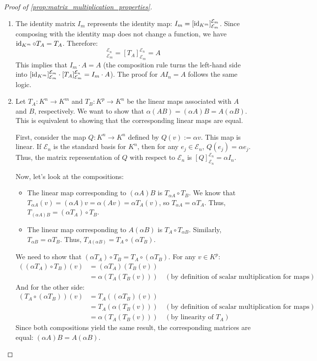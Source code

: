 \begin{proof}[Proof of \cref{prop:matrix_multiplication_properties}]
\begin{enumerate}[label=\textbf{(\alph*)}]
    \item The identity matrix $I_m$ represents the identity map: $I_m = [\operatorname{id}_{K^m}]_{\mathcal{E}_m}^{\mathcal{E}_m}$. Since composing with the identity map does not change a function, we have $\operatorname{id}_{K^m} \circ T_A = T_A$. Therefore:
    \begin{equation*}
        [\id_{K^m} \circ T_A]_{\mathcal{E}_m}^{\mathcal{E}_n} = [T_A]_{\mathcal{E}_m}^{\mathcal{E}_n} = A
    \end{equation*}
    This implies that $I_m \cdot A = A$ (the composition rule turns the left-hand side into $[\operatorname{id}_{K^m}]_{\mathcal{E}_m}^{\mathcal{E}_m} \cdot [T_A]_{\mathcal{E}_m}^{\mathcal{E}_n} = I_m \cdot A$). The proof for $A I_n = A$ follows the same logic.
    
    \item Let $T_A: K^n \to K^m$ and $T_B: K^p \to K^n$ be the linear maps associated with $A$ and $B$, respectively. We want to show that $\alpha(AB) = (\alpha A)B = A(\alpha B)$. This is equivalent to showing that the corresponding linear maps are equal.
    
    First, consider the map $Q: K^n \to K^n$ defined by $Q(v) := \alpha v$. This map is linear. If $\mathcal{E}_n$ is the standard basis for $K^n$, then for any $e_j \in \mathcal{E}_n$, $Q(e_j) = \alpha e_j$. Thus, the matrix representation of $Q$ with respect to $\mathcal{E}_n$ is $[Q]_{\mathcal{E}_n}^{\mathcal{E}_n} = \alpha I_n$.
    
    Now, let's look at the compositions:
    \begin{itemize}
        \item The linear map corresponding to $(\alpha A)B$ is $T_{\alpha A} \circ T_B$. We know that $T_{\alpha A}(v) = (\alpha A)v = \alpha(Av) = \alpha T_A(v)$, so $T_{\alpha A} = \alpha T_A$. Thus, $T_{(\alpha A)B} = (\alpha T_A) \circ T_B$.
        \item The linear map corresponding to $A(\alpha B)$ is $T_A \circ T_{\alpha B}$. Similarly, $T_{\alpha B} = \alpha T_B$. Thus, $T_{A(\alpha B)} = T_A \circ (\alpha T_B)$.
    \end{itemize}
    
    We need to show that $(\alpha T_A) \circ T_B = T_A \circ (\alpha T_B)$. For any $v \in K^p$:
    \begin{align*}
        ((\alpha T_A) \circ T_B)(v) &= (\alpha T_A)(T_B(v)) \\
        &= \alpha (T_A(T_B(v))) \quad (\text{by definition of scalar multiplication for maps})
    \end{align*}
    And for the other side:
    \begin{align*}
        (T_A \circ (\alpha T_B))(v) &= T_A((\alpha T_B)(v)) \\
        &= T_A(\alpha (T_B(v))) \quad (\text{by definition of scalar multiplication for maps}) \\
        &= \alpha (T_A(T_B(v))) \quad (\text{by linearity of } T_A)
    \end{align*}
    Since both compositions yield the same result, the corresponding matrices are equal: $(\alpha A)B = A(\alpha B)$.
    

\end{enumerate}
\end{proof}
